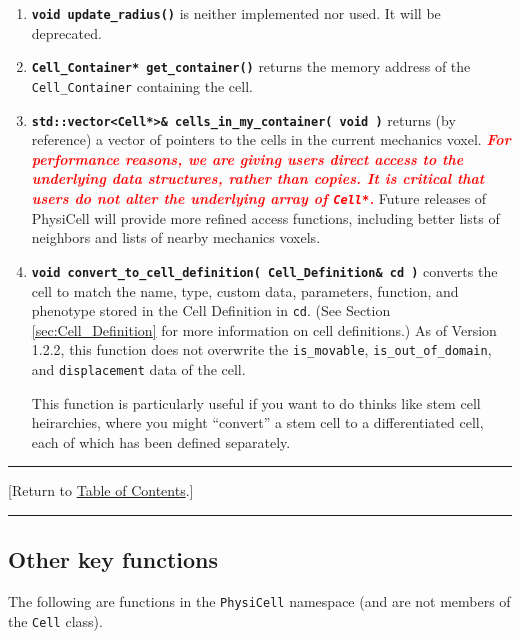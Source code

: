 \documentclass[12pt]{article}
\renewcommand{\v}{\verb}
\newcommand{\smallcode}[1]{\textbf{\texttt{#1}}}
\newcommand{\red}[1]{\textcolor{red}{#1}}
\newcommand{\TOClink}{\begin{center}\hrule\vskip-10pt\phantom{.}\hfill[Return to \hyperlink{TOC}{Table of Contents}.]\hfill\phantom{.}\vskip3pt\hrule\end{center}}
\begin{document}
\begin{enumerate}
\item 
\smallcode{void update\_radius()} is neither implemented nor used. It will 
be deprecated. 

\item 
\smallcode{Cell\_Container* get\_container()} returns the memory 
address of the \v|Cell_Container| containing the cell. 

\item 
\smallcode{std::vector<Cell*>\& cells\_in\_my\_container( void )} returns (by reference) 
a vector of pointers to the cells in the current mechanics voxel. 
\red{\textbf{\emph{For performance reasons, we are giving users direct access to the underlying 
data structures, rather than copies. It is critical that users do not alter the underlying 
array of \texttt{Cell*}.}}} Future releases of PhysiCell will provide more refined 
access functions, including better lists of neighbors and lists of 
nearby mechanics voxels. 

\item 
\smallcode{void convert\_to\_cell\_definition( Cell\_Definition\& cd )} converts 
the cell to match the name, type, custom data, parameters, function, and phenotype 
stored in the Cell Definition in \verb+cd+. (See Section \ref{sec:Cell_Definition} for more 
information on cell definitions.) As of Version 1.2.2, this function does not overwrite 
the \v|is_movable|, \v|is_out_of_domain|, and \v|displacement| data of the cell. 

This function is particularly useful if you want to do thinks like stem cell heirarchies, where you 
might ``convert'' a stem cell to a differentiated cell, each of which has been defined 
separately. 

\end{enumerate} 

\TOClink 

\subsection{Other key functions}
\label{sec:other_key_cell_functions}
The following are functions in the \v|PhysiCell| namespace 
(and are not members of the \v|Cell| class). 
\end{document}
